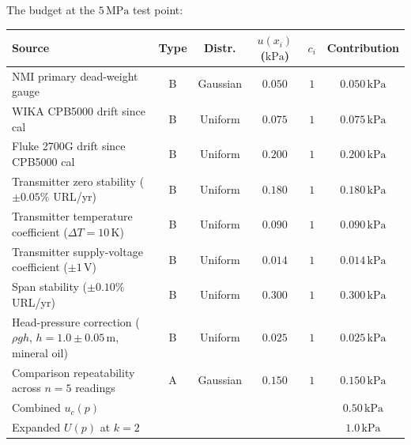 The budget at the $5\,\si{\mega\pascal}$ test point:

\begin{center}
\small
\begin{tabular}{lccccc}
\toprule
Source & Type & Distr. & $u(x_{i})$ ($\si{\kilo\pascal}$) & $c_{i}$ & Contribution \\
\midrule
NMI primary dead-weight gauge & B & Gaussian & $0.050$ & $1$ & $0.050\,\si{\kilo\pascal}$ \\
WIKA CPB5000 drift since cal & B & Uniform & $0.075$ & $1$ & $0.075\,\si{\kilo\pascal}$ \\
Fluke 2700G drift since CPB5000 cal & B & Uniform & $0.200$ & $1$ & $0.200\,\si{\kilo\pascal}$ \\
Transmitter zero stability ($\pm 0.05\%$ URL/yr) & B & Uniform & $0.180$ & $1$ & $0.180\,\si{\kilo\pascal}$ \\
Transmitter temperature coefficient ($\Delta T = 10\,\si{\kelvin}$) & B & Uniform & $0.090$ & $1$ & $0.090\,\si{\kilo\pascal}$ \\
Transmitter supply-voltage coefficient ($\pm 1\,\si{\volt}$) & B & Uniform & $0.014$ & $1$ & $0.014\,\si{\kilo\pascal}$ \\
Span stability ($\pm 0.10\%$ URL/yr) & B & Uniform & $0.300$ & $1$ & $0.300\,\si{\kilo\pascal}$ \\
Head-pressure correction ($\rho g h$, $h = 1.0 \pm 0.05\,\si{\meter}$, mineral oil) & B & Uniform & $0.025$ & $1$ & $0.025\,\si{\kilo\pascal}$ \\
Comparison repeatability across $n = 5$ readings & A & Gaussian & $0.150$ & $1$ & $0.150\,\si{\kilo\pascal}$ \\
\midrule
Combined $u_{c}(p)$ & & & & & $0.50\,\si{\kilo\pascal}$ \\
Expanded $U(p)$ at $k = 2$ & & & & & $1.0\,\si{\kilo\pascal}$ \\
\bottomrule
\end{tabular}
\end{center}


